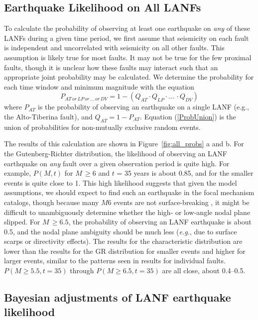 \documentclass[draft,grl]{AGUTeX}
\begin{document}
\begin{article}
\subsection{Earthquake Likelihood on All LANFs}
To calculate the probability of observing at least one earthquake on \emph{any}
of these LANFs during a given time period, we first assume that seismicity on
each fault is independent and uncorrelated with seismicity on all other faults.
This assumption is likely true for most faults. It may not be true for the few
proximal faults, though it is unclear how these faults may interact such that
an appropriate joint probability may be calculated. We determine the
probability for each time window and minimum magnitude with the equation
\begin{equation}
P_{AT \, or \, LP\, or\, \ldots \, or \, DV} = 1 - (Q_{AT} \cdot Q_{LP} \cdot \ldots \, \cdot Q_{DV})
\label{ProbUnion}
\end{equation}
where $P_{AT}$ is the probability of observing an earthquake on a single LANF
(e.g., the Alto-Tiberina fault), and $Q_{AT} = 1 - P_{AT}$. Equation
(\ref{ProbUnion}) is the union of probabilities for non-mutually exclusive
random events. 

The results of this calculation are shown in Figure~\ref{fig:all_probs} a and b.
For the Gutenberg-Richter distribution, the likelihood of observing an LANF
earthquake on \emph{any} fault over a given observation period is quite high.
For example, $P(M,t)$ for $M \, \ge 6$ and $t$ = 35 years is about 0.85, and
for the smaller events is quite close to 1.  This high likelihood suggests that
given the model assumptions, we should expect to find such an earthquake in the
focal mechanism catalogs, though because many $M6$ events are not
surface-breaking \citep{hecker2013eqdist}, it might be difficult to
unambiguously determine whether the high- or low-angle nodal plane slipped.
For $M \, \ge 6.5$, the probability of observing an LANF earthquake is about
0.5, and the nodal plane ambiguity should be much less ({\it e.g.}, due to
surface scarps or directivity effects). The results for the characteristic
distribution are lower than the results for the GR distribution for smaller
events and higher for larger events, similar to the patterns seen in results
for individual faults. $P(M\ge5.5,t=35)$ through $P(M\ge6.5,t=35)$ are all
close, about 0.4--0.5.

\subsection{Bayesian adjustments of LANF earthquake likelihood}


\end{article}
\end{document}
